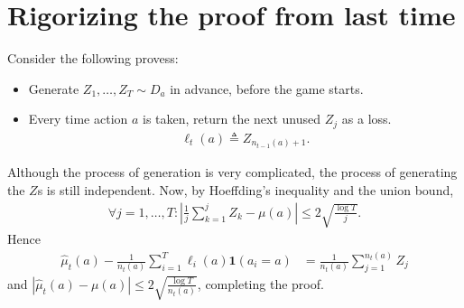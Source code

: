 \documentclass[11pt]{article}
\newcommand{\te}{\triangleq}
\begin{document}
\section{Rigorizing the proof from last time}
Consider the following provess:
\begin{itemize}
  \item Generate $Z_1, \dots, Z_T \sim D_a$ in advance, before the game starts.
  \item Every time action $a$ is taken, return the next unused $Z_j$ as a loss.
    \begin{align*}
      \ell_t(a) \te Z_{n_{t - 1}(a) + 1}.
    \end{align*}
\end{itemize}

Although the process of generation is very complicated,
the process of generating the $Z$s is still independent.
Now, by Hoeffding's inequality and the union bound,
\begin{align*}
  \forall j = 1, \dots, T: \left|\frac{1}{j}\sum_{k = 1}^j Z_k - \mu(a)\right| \leq 2\sqrt{\frac{\log T}{j}}.
\end{align*}
Hence
\begin{align*}
  \hat \mu_t(a) - \frac{1}{n_t(a)}\sum_{i = 1}^T \ell_i(a)\mathbf{1} (a_i = a)
  &= \frac{1}{n_t(a)} \sum_{j = 1}^{n_{t}(a)} Z_j
\end{align*}
and $|\hat \mu_t(a) - \mu(a)| \leq 2\sqrt{\frac{\log T}{n_t(a)}}$, completing the proof.
\end{document}
